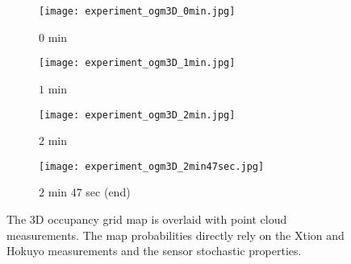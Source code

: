 
\begin{figure}[!t]
\centering
    	\begin{subfigure}[t]{0.65\columnwidth}
           	\centering
          	\texttt{[image: experiment\_ogm3D\_0min.jpg]}
        		\caption{$0$ min}
    	\end{subfigure}
    	\begin{subfigure}[t]{0.65\columnwidth}
		\vspace*{0.01\columnwidth}
           	\centering
          	\texttt{[image: experiment\_ogm3D\_1min.jpg]}
        		\caption{$1$ min}
    	\end{subfigure}
    	\begin{subfigure}[t]{0.65\columnwidth}
	\vspace*{0.01\columnwidth}
           	\centering
          	\texttt{[image: experiment\_ogm3D\_2min.jpg]}
        		\caption{$2$ min}
    	\end{subfigure}
    	\begin{subfigure}[t]{0.65\columnwidth}
	\vspace*{0.01\columnwidth}
           	\centering
          	\texttt{[image: experiment\_ogm3D\_2min47sec.jpg]}
        		\caption{$2$ min $47$ sec (end)}
    	\end{subfigure}
	\caption{The 3D occupancy grid map is overlaid with point cloud measurements. The map probabilities directly rely on the Xtion and Hokuyo measurements and the sensor stochastic properties.}
	\label{fig:exp3DMap}
\end{figure}

